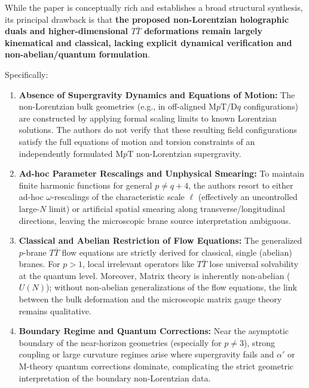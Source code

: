 \documentclass[11pt,a4paper]{article}
\begin{document}
While the paper is conceptually rich and establishes a broad structural synthesis, its principal drawback is that \textbf{the proposed non-Lorentzian holographic duals and higher-dimensional $T\bar{T}$ deformations remain largely kinematical and classical, lacking explicit dynamical verification and non-abelian/quantum formulation}.

Specifically:
\begin{enumerate}
    \item \textbf{Absence of Supergravity Dynamics and Equations of Motion:} 
    The non-Lorentzian bulk geometries (e.g., in off-aligned $\text{M}p\text{T}/\text{D}q$ configurations) are constructed by applying formal scaling limits to known Lorentzian solutions. The authors do not verify that these resulting field configurations satisfy the full equations of motion and torsion constraints of an independently formulated $\text{M}p\text{T}$ non-Lorentzian supergravity.
    
    \item \textbf{Ad-hoc Parameter Rescalings and Unphysical Smearing:} 
    To maintain finite harmonic functions for general $p \neq q + 4$, the authors resort to either ad-hoc $\omega$-rescalings of the characteristic scale $\ell$ (effectively an uncontrolled large-$N$ limit) or artificial spatial smearing along transverse/longitudinal directions, leaving the microscopic brane source interpretation ambiguous.
    
    \item \textbf{Classical and Abelian Restriction of Flow Equations:} 
    The generalized $p$-brane $T\bar{T}$ flow equations are strictly derived for classical, single (abelian) branes. For $p > 1$, local irrelevant operators like $T\bar{T}$ lose universal solvability at the quantum level. Moreover, Matrix theory is inherently non-abelian ($U(N)$); without non-abelian generalizations of the flow equations, the link between the bulk deformation and the microscopic matrix gauge theory remains qualitative.
    
    \item \textbf{Boundary Regime and Quantum Corrections:} 
    Near the asymptotic boundary of the near-horizon geometries (especially for $p \neq 3$), strong coupling or large curvature regimes arise where supergravity fails and $\alpha'$ or M-theory quantum corrections dominate, complicating the strict geometric interpretation of the boundary non-Lorentzian data.
\end{enumerate}
\end{document}
